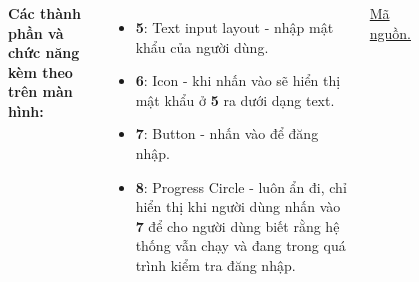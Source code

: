 \documentclass{beamer}
\begin{document}
\begin{frame}
\begin{columns}
\begin{figure}
        \end{figure}
        \indent \textbf{Các thành phần và chức năng kèm theo trên màn hình:}
        \begin{itemize}
            \item \textbf{5}: Text input layout - nhập mật khẩu của người dùng.
            \item \textbf{6}: Icon - khi nhấn vào sẽ hiển thị mật khẩu ở \textbf{5} ra dưới dạng text.
            \item \textbf{7}: Button - nhấn vào để đăng nhập.
            \item \textbf{8}: Progress Circle - luôn ẩn đi, chỉ hiển thị khi người dùng nhấn vào \textbf{7} để cho người dùng biết rằng hệ thống vẫn chạy và đang trong quá trình kiểm tra đăng nhập.
        \end{itemize}

        \href{https://github.com/cuongpiger/Sharing/blob/main/Clover/SignInFragment.java}{\color{blue} Mã nguồn.}
    \end{columns}
\end{frame}
\end{document}
